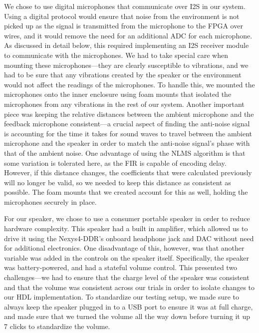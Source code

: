 \documentclass{fpgairpods}
\begin{document}
We chose to use digital microphones that communicate over I2S in our system. Using a digital protocol would ensure that noise from the environment is not picked up as the signal is transmitted from the microphone to the FPGA over wires, and it would remove the need for an additional ADC for each microphone. As discussed in detail below, this required implementing an I2S receiver module to communicate with the microphones. We had to take special care when mounting these microphones---they are clearly susceptible to vibrations, and we had to be sure that any vibrations created by the speaker or the environment would not affect the readings of the microphones. To handle this, we mounted the microphones onto the inner enclosure using foam mounts that isolated the microphones from any vibrations in the rest of our system. Another important piece was keeping the relative distances between the ambient microphone and the feedback microphone consistent---a crucial aspect of finding the anti-noise signal is accounting for the time it takes for sound waves to travel between the ambient microphone and the speaker in order to match the anti-noise signal's phase with that of the ambient noise. One advantage of using the NLMS algorithm is that some variation is tolerated here, as the FIR is capable of encoding delay. However, if this distance changes, the coefficients that were calculated previously will no longer be valid, so we needed to keep this distance as consistent as possible. The foam mounts that we created account for this as well, holding the microphones securely in place. 

For our speaker, we chose to use a consumer portable speaker in order to reduce hardware complexity. This speaker had a built in amplifier, which allowed us to drive it using the Nexys4-DDR's onboard headphone jack and DAC without need for additional electronics. One disadvantage of this, however, was that another variable was added in the controls on the speaker itself. Specifically, the speaker was battery-powered, and had a stateful volume control. This presented two challenges---we had to ensure that the charge level of the speaker was consistent and that the volume was consistent across our trials in order to isolate changes to our HDL implementation. To standardize our testing setup, we made sure to always keep the speaker plugged in to a USB port to ensure it was at full charge, and made sure that we turned the volume all the way down before turning it up 7 clicks to standardize the volume. %
\end{document}
